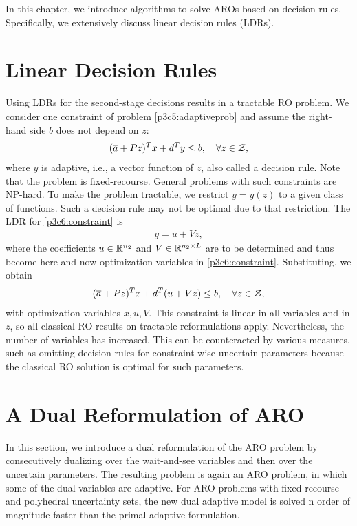 In this chapter, we introduce algorithms to solve AROs based on decision rules. Specifically, we extensively discuss linear decision rules (LDRs).

\section{Linear Decision Rules}

Using LDRs for the second-stage decisions results in a tractable RO problem. We consider one constraint of problem \ref{p3c5:adaptiveprob} and assume the right-hand side $b$ does not depend on $z$:
\begin{align}\label{p3c6:constraint}
(\overline{ a }+Pz)^Tx+d^Ty \leq b, \quad \forall z\in\mathcal{Z},
\end{align}
where $y$ is adaptive, i.e., a vector function of $z$, also called a decision rule. Note that the problem is fixed-recourse. General problems with such constraints are NP-hard. To make the problem tractable, we restrict $y = y(z)$ to a given class of functions. Such a decision rule may not be optimal due to that restriction. The LDR for \eqref{p3c6:constraint} is 
\begin{align}
y = u+Vz,
\end{align}
where the coefficients $u\in\mathbb{R}^{n_2}$ and $V\in\mathbb{R}^{n_2\times L}$ are to be determined and thus become here-and-now optimization variables in \eqref{p3c6:constraint}. Substituting, we obtain
\begin{align}
(\overline{ a }+Pz)^Tx+d^T(u+Vz) \leq b, \quad \forall z\in\mathcal{Z},
\end{align}
with optimization variables $x,u,V$. This constraint is linear in all variables and in $z$, so all classical RO results on tractable reformulations apply. Nevertheless, the number of variables has increased. This can be counteracted by various measures, such as omitting decision rules for constraint-wise uncertain parameters because the classical RO solution is optimal for such parameters.

\section{A Dual Reformulation of ARO}

In this section, we introduce a dual reformulation of the ARO problem by consecutively dualizing over the wait-and-see variables and then over the uncertain parameters. The resulting problem is again an ARO problem, in which some of the dual variables are adaptive. For ARO problems with fixed recourse and polyhedral uncertainty sets, the new dual adaptive model is solved n order of magnitude faster than the primal adaptive formulation.

